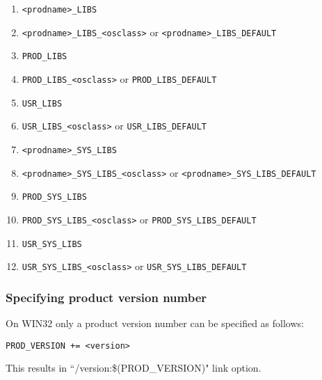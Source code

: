 \begin{enumerate}
\item {}\verb|<prodname>_LIBS|

\item \verb|<prodname>_LIBS_<osclass>| or \verb|<prodname>_LIBS_DEFAULT|

\item {}\verb|PROD_LIBS|

\item \verb|PROD_LIBS_<osclass>| or \verb|PROD_LIBS_DEFAULT|

\item {}\verb|USR_LIBS|

\item \verb|USR_LIBS_<osclass>| or \verb|USR_LIBS_DEFAULT|

\item {}\verb|<prodname>_SYS_LIBS|

\item \verb|<prodname>_SYS_LIBS_<osclass>| or \verb|<prodname>_SYS_LIBS_DEFAULT|

\item {}\verb|PROD_SYS_LIBS|

\item \verb|PROD_SYS_LIBS_<osclass>| or \verb|PROD_SYS_LIBS_DEFAULT|

\item {}\verb|USR_SYS_LIBS|

\item \verb|USR_SYS_LIBS_<osclass>| or \verb|USR_SYS_LIBS_DEFAULT|

\end{enumerate}

\subsubsection{Specifying product version number}

On WIN32 only a product version number can be specified as follows:

\begin{description}
\item {}\verb|PROD_VERSION += <version>|

\end{description}

This results in ``/version:\$(PROD\_VERSION)" link option.

